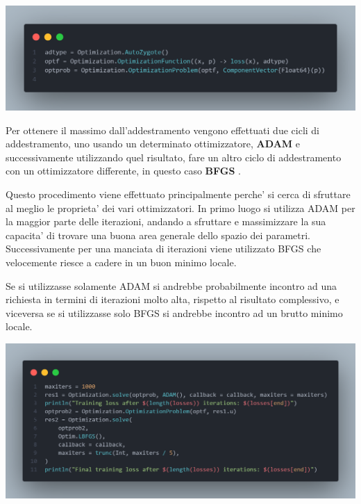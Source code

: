 \begin{minipage}{\linewidth}
	\centering
	\includegraphics[width=\textwidth]{img/optimization_functions.png}
	\label{fig:optimization_function}
\end{minipage}

Per ottenere il massimo dall'addestramento vengono effettuati due cicli di addestramento, 
uno usando un determinato ottimizzatore, \textbf{ADAM} e successivamente utilizzando quel 
risultato, fare un altro ciclo di addestramento con un ottimizzatore differente, in questo 
caso \textbf{BFGS} \cite{10.1093/imamat/6.1.76} \cite{10.1093/comjnl/13.3.317} 
\cite{35d0019d-775a-3628-b0b4-67be112e346b} \cite{e3177091-3094-3792-9d61-0ab445735ddb}.

Questo procedimento viene effettuato principalmente perche' si cerca di sfruttare al meglio le
proprieta' dei vari ottimizzatori. In primo luogo si utilizza ADAM per la maggior parte delle 
iterazioni, andando a sfruttare e massimizzare la sua capacita' di trovare una buona area 
generale dello spazio dei parametri. Successivamente per una manciata di iterazioni viene utilizzato 
BFGS che velocemente riesce a cadere in un buon minimo locale. 

Se si utilizzasse solamente ADAM si andrebbe probabilmente incontro ad una richiesta in 
termini di iterazioni molto alta, rispetto al risultato complessivo, e viceversa
se si utilizzasse solo BFGS si andrebbe incontro ad un brutto minimo locale.

\begin{minipage}{\linewidth}
	\centering
	\includegraphics[width=\textwidth]{img/training.png}
	\label{fig:training_function}
\end{minipage}

